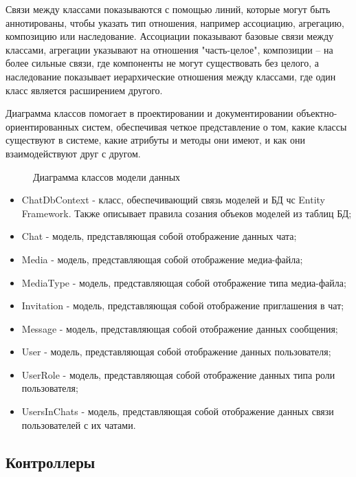 Связи между классами показываются с помощью линий, которые могут быть аннотированы, чтобы указать тип отношения, например ассоциацию, агрегацию, композицию или наследование. Ассоциации показывают базовые связи между классами, агрегации указывают на отношения "часть-целое", композиции – на более сильные связи, где компоненты не могут существовать без целого, а наследование показывает иерархические отношения между классами, где один класс является расширением другого.

Диаграмма классов помогает в проектировании и документировании объектно-ориентированных систем, обеспечивая четкое представление о том, какие классы существуют в системе, какие атрибуты и методы они имеют, и как они взаимодействуют друг с другом.

\begin{landscape}
	\begin{figure}[ht]
		\caption{Диаграмма классов модели данных}
		\label{data_model:image}
	\end{figure}
\end{landscape}

\begin{itemize}
	\item ChatDbContext - класс, обеспечивающий связь моделей и БД чс Entity Framework. Также описывает правила созания объеков моделей из таблиц БД;
	\item Chat - модель, представляющая собой отображение данных чата;
	\item Media - модель, представляющая собой отображение медиа-файла;
	\item MediaType - модель, представляющая собой отображение типа медиа-файла;
	\item Invitation - модель, представляющая собой отображение приглашения в чат;
	\item Message - модель, представляющая собой отображение данных сообщения;
	\item User - модель, представляющая собой отображение данных пользователя;
	\item UserRole - модель, представляющая собой отображение данных типа роли пользователя;
	\item UsersInChats - модель, представляющая собой отображение данных связи пользователей с их чатами.
\end{itemize}

\subsection{Контроллеры}

